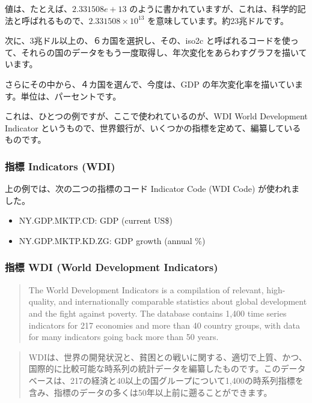 \documentclass[
]{bxjsbook}
\providecommand{\tightlist}{%
  \setlength{\itemsep}{0pt}\setlength{\parskip}{0pt}}
\theoremstyle{definition}
\theoremstyle{definition}
\theoremstyle{definition}
\theoremstyle{definition}
\theoremstyle{remark}
\begin{document}
値は、たとえば、\(2.331508e+13\) のように書かれていますが、これは、科学的記法と呼ばれるもので、\(2.331508 \times 10^{13}\) を意味しています。約23兆ドルです。

次に、3兆ドル以上の、６カ国を選択し、その、iso2c と呼ばれるコードを使って、それらの国のデータをもう一度取得し、年次変化をあらわすグラフを描いています。

さらにその中から、４カ国を選んで、今度は、GDP の年次変化率を描いています。単位は、パーセントです。

これは、ひとつの例ですが、ここで使われているのが、WDI World Development Indicator というもので、世界銀行が、いくつかの指標を定めて、編纂しているものです。

\hypertarget{ux6307ux6a19-indicators-wdi}{%
\subsubsection{指標 Indicators (WDI)}\label{ux6307ux6a19-indicators-wdi}}

上の例では、次の二つの指標のコード Indicator Code (WDI Code) が使われました。

\begin{itemize}
\tightlist
\item
  NY.GDP.MKTP.CD: GDP (current US\$)
\item
  NY.GDP.MKTP.KD.ZG: GDP growth (annual \%)
\end{itemize}

\hypertarget{ux6307ux6a19-wdi-world-development-indicators}{%
\subsubsection{指標 WDI (World Development Indicators)}\label{ux6307ux6a19-wdi-world-development-indicators}}

\begin{quote}
The World Development Indicators is a compilation of relevant, high-quality, and internationally comparable statistics about global development and the fight against poverty. The database contains 1,400 time series indicators for 217 economies and more than 40 country groups, with data for many indicators going back more than 50 years.
\end{quote}

\begin{quote}
WDIは、世界の開発状況と、貧困との戦いに関する、適切で上質、かつ、国際的に比較可能な時系列の統計データを編纂したものです。このデータベースは、217の経済と40以上の国グループについて1,400の時系列指標を含み、指標のデータの多くは50年以上前に遡ることができます。
\end{quote}
\end{document}
